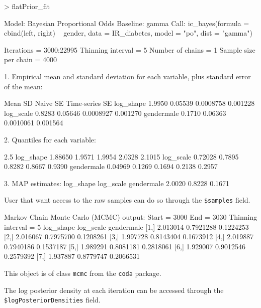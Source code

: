 \documentclass[a4paper]{article}
\begin{document}
\begin{Schunk}
\begin{Sinput}
> flatPrior_fit
\end{Sinput}
\begin{Soutput}
Model:  Bayesian Proportional Odds
Baseline:  gamma 
Call: ic_bayes(formula = cbind(left, right) ~ gender, data = IR_diabetes, 
    model = "po", dist = "gamma")


Iterations = 3000:22995
Thinning interval = 5 
Number of chains = 1 
Sample size per chain = 4000 

1. Empirical mean and standard deviation for each variable,
   plus standard error of the mean:

             Mean      SD  Naive SE Time-series SE
log_shape  1.9950 0.05539 0.0008758       0.001228
log_scale  0.8283 0.05646 0.0008927       0.001270
gendermale 0.1710 0.06363 0.0010061       0.001564

2. Quantiles for each variable:

              2.5%
log_shape  1.88650 1.9571 1.9954 2.0328 2.1015
log_scale  0.72028 0.7895 0.8282 0.8667 0.9390
gendermale 0.04969 0.1269 0.1694 0.2138 0.2957

3. MAP estimates:
 log_shape  log_scale gendermale 
    2.0020     0.8228     0.1671 
\end{Soutput}
\end{Schunk}

User that want access to the raw samples can do so through the \texttt{\$samples}
field. 

\begin{Schunk}
\begin{Soutput}
Markov Chain Monte Carlo (MCMC) output:
Start = 3000 
End = 3030 
Thinning interval = 5 
     log_shape log_scale gendermale
[1,]  2.013014 0.7921288  0.1224253
[2,]  2.016067 0.7975700  0.1208261
[3,]  1.997728 0.8143404  0.1673912
[4,]  2.019887 0.7940186  0.1537187
[5,]  1.989291 0.8081181  0.2818061
[6,]  1.929007 0.9012546  0.2579392
[7,]  1.937887 0.8779747  0.2066531
\end{Soutput}
\end{Schunk}

This object is of class \texttt{mcmc} from the \texttt{coda} package. 

The log posterior density at each iteration can be accessed through the \texttt{\$logPosteriorDensities} field. 
\end{document}
